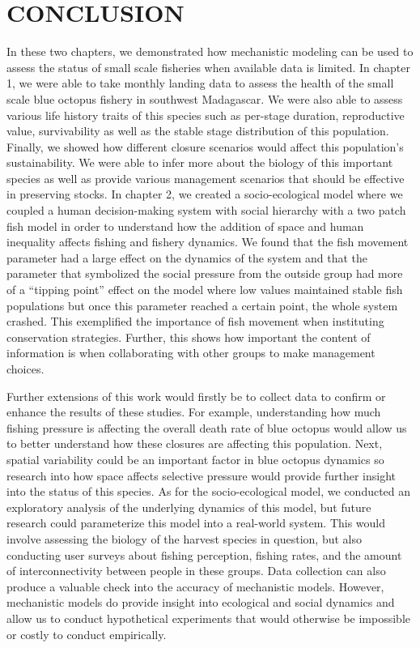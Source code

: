 \documentclass[
]{article}
\author{}
\date{\vspace{-2.5em}}
\begin{document}
\setcounter{page}{51}

\linenumbers

\hypertarget{conclusion}{%
\section{CONCLUSION}\label{conclusion}}

In these two chapters, we demonstrated how mechanistic modeling can be used to assess the status of small scale fisheries when available data is limited. In chapter 1, we were able to take monthly landing data to assess the health of the small scale blue octopus fishery in southwest Madagascar. We were also able to assess various life history traits of this species such as per-stage duration, reproductive value, survivability as well as the stable stage distribution of this population. Finally, we showed how different closure scenarios would affect this population's sustainability. We were able to infer more about the biology of this important species as well as provide various management scenarios that should be effective in preserving stocks. In chapter 2, we created a socio-ecological model where we coupled a human decision-making system with social hierarchy with a two patch fish model in order to understand how the addition of space and human inequality affects fishing and fishery dynamics. We found that the fish movement parameter had a large effect on the dynamics of the system and that the parameter that symbolized the social pressure from the outside group had more of a ``tipping point'' effect on the model where low values maintained stable fish populations but once this parameter reached a certain point, the whole system crashed. This exemplified the importance of fish movement when instituting conservation strategies. Further, this shows how important the content of information is when collaborating with other groups to make management choices.

Further extensions of this work would firstly be to collect data to confirm or enhance the results of these studies. For example, understanding how much fishing pressure is affecting the overall death rate of blue octopus would allow us to better understand how these closures are affecting this population. Next, spatial variability could be an important factor in blue octopus dynamics so research into how space affects selective pressure would provide further insight into the status of this species. As for the socio-ecological model, we conducted an exploratory analysis of the underlying dynamics of this model, but future research could parameterize this model into a real-world system. This would involve assessing the biology of the harvest species in question, but also conducting user surveys about fishing perception, fishing rates, and the amount of interconnectivity between people in these groups. Data collection can also produce a valuable check into the accuracy of mechanistic models. However, mechanistic models do provide insight into ecological and social dynamics and allow us to conduct hypothetical experiments that would otherwise be impossible or costly to conduct empirically.
\end{document}
